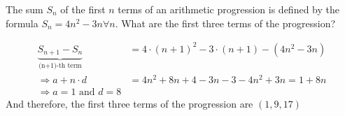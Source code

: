 
%
%
%
%
% 
% 

\question The sum $S_n$ of the first $n$ terms of an arithmetic progression is defined by
the formula $S_n = 4n^2-3n \forall n$. What are the first three terms of the progression? 

\insertQR{}

\ifprintanswers
\fi 

\begin{solution}
	\begin{align}
		\underbrace{S_{n+1}-S_{n}}_{\text{(n+1)-th term}} &= 4\cdot(n+1)^2-3\cdot(n+1) - (4n^2-3n) \\
		\Rightarrow a + n\cdot d &= 4n^2+8n+4-3n-3-4n^2+3n = 1 + 8n \\
		\Rightarrow a = 1 \text{ and } d = 8
	\end{align}
	And therefore, the first three terms of the progression are $(1,9,17)$
\end{solution}

